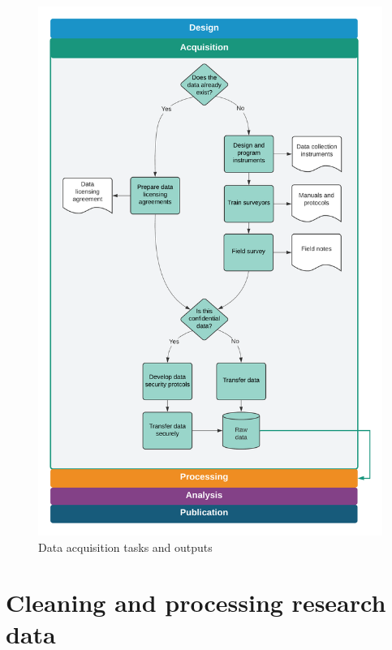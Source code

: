 \documentclass[
]{book}
\begin{document}
\begin{figure}
\includegraphics[width=29.17in]{diagrams/Acquisition} \caption{Data acquisition tasks and outputs}\label{fig:unnamed-chunk-26}
\end{figure}

\hypertarget{processing}{%
\chapter{Cleaning and processing research data}\label{processing}}
\end{document}
